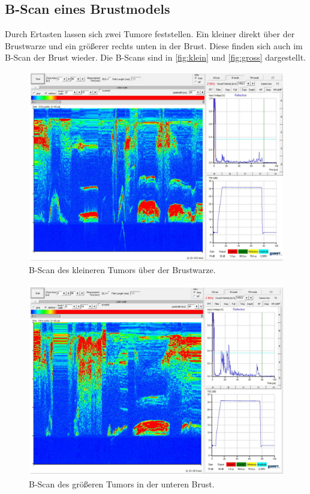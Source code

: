 \subsection{B-Scan eines Brustmodels}
Durch Ertasten lassen sich zwei Tumore feststellen. Ein kleiner direkt über der Brustwarze und ein größerer rechts
unten in der Brust. Diese finden sich auch im B-Scan der Brust wieder. Die B-Scans sind in \autoref{fig:klein} und
\autoref{fig:gross} dargestellt.
\begin{figure}
  \centering
  \includegraphics[width=\textwidth]{messwerte/Boobie/Obenklein.jpg}
  \caption{B-Scan des kleineren Tumors über der Brustwarze.}
  \label{fig:klein}
\end{figure}
\begin{figure}
  \centering
  \includegraphics[width=\textwidth]{messwerte/Boobie/Untengross.jpg}
  \caption{B-Scan des größeren Tumors in der unteren Brust.}
  \label{fig:gross}
\end{figure}